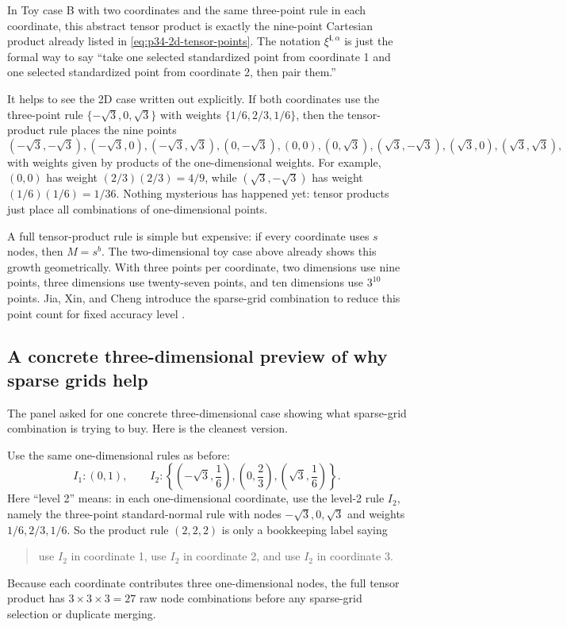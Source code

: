\documentclass[11pt]{article}
\numberwithin{equation}{section}
\begin{document}
In Toy case B with two coordinates and the same three-point rule in each
coordinate, this abstract tensor product is exactly the nine-point Cartesian
product already listed in \eqref{eq:p34-2d-tensor-points}.  The notation
\(\xi^{\mathbf i,\alpha}\) is just the formal way to say ``take one selected
standardized point from coordinate 1 and one selected standardized point from
coordinate 2, then pair them.''

It helps to see the 2D case written out explicitly.  If both coordinates use the
three-point rule \(\{-\sqrt3,0,\sqrt3\}\) with weights
\(\{1/6,2/3,1/6\}\), then the tensor-product rule places the nine points
\begin{equation}
  (-\sqrt3,-\sqrt3),
  (-\sqrt3,0),
  (-\sqrt3,\sqrt3),
  (0,-\sqrt3),
  (0,0),
  (0,\sqrt3),
  (\sqrt3,-\sqrt3),
  (\sqrt3,0),
  (\sqrt3,\sqrt3),
  \label{eq:p35-nine-point-grid}
\end{equation}
with weights given by products of the one-dimensional weights.  For example,
\((0,0)\) has weight \((2/3)(2/3)=4/9\), while
\((\sqrt3,-\sqrt3)\) has weight \((1/6)(1/6)=1/36\).  Nothing mysterious has
happened yet: tensor products just place all combinations of one-dimensional
points.

A full tensor-product rule is simple but expensive: if every coordinate uses
\(s\) nodes, then \(M=s^b\).  The two-dimensional toy case above already shows
this growth geometrically.  With three points per coordinate, two dimensions use
nine points, three dimensions use twenty-seven points, and ten dimensions use
\(3^{10}\) points.  Jia, Xin, and Cheng introduce the sparse-grid
combination to reduce this point count for fixed accuracy level
\cite[Section 3]{jia2012sparsegrid}.

\subsection{A concrete three-dimensional preview of why sparse grids help}
\label{subsec:p37-3d-preview}

The panel asked for one concrete three-dimensional case showing what sparse-grid
combination is trying to buy.  Here is the cleanest version.

Use the same one-dimensional rules as before:
\begin{equation}
  I_1:(0,1),
  \qquad
  I_2:\left\{\left(-\sqrt3,\frac16\right),\left(0,\frac23\right),
  \left(\sqrt3,\frac16\right)\right\}.
  \label{eq:p37-level1-level2-rules}
\end{equation}
Here ``level 2'' means: in each one-dimensional coordinate, use the level-2 rule
\(I_2\), namely the three-point standard-normal rule with nodes
\(-\sqrt3,0,\sqrt3\) and weights \(1/6,2/3,1/6\).  So the product rule
\((2,2,2)\) is only a bookkeeping label saying
\begin{quote}
use \(I_2\) in coordinate 1, use \(I_2\) in coordinate 2, and use \(I_2\) in
coordinate 3.
\end{quote}
Because each coordinate contributes three one-dimensional nodes, the full tensor
product has \(3\times 3\times 3=27\) raw node combinations before any sparse-grid
selection or duplicate merging.
\end{document}
